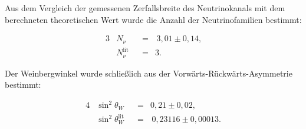 Aus dem Vergleich der gemessenen Zerfallsbreite des Neutrinokanals mit dem berechneten theoretischen Wert wurde die Anzahl der Neutrinofamilien bestimmt:

\begin{alignat*}{3}
&N_\nu&&=&\,3,01\pm0,14\text{,}\\
&N_\nu^\text{lit}&&=&3\text{.}
\end{alignat*} 

Der Weinbergwinkel wurde schließlich aus der Vorwärts-Rückwärts-Asymmetrie bestimmt:

\begin{alignat*}{4}
&\sin^2\theta_W&&=&0,21\pm0,02\text{,}\\
&\sin^2\theta_W^\text{lit}&&=&\,0,23116\pm0,00013\text{.}
\end{alignat*}
